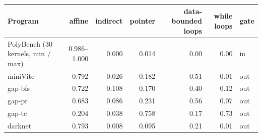 \begin{tabular}{lrrrrrl}
\toprule
Program & affine & indirect & pointer & data-bounded loops & while loops & gate \\
\midrule
PolyBench (30 kernels, min / max) & 0.986--1.000 & 0.000 & 0.014 & 0.00 & 0.00 & in \\
miniVite & 0.792 & 0.026 & 0.182 & 0.51 & 0.01 & out \\
gap-bfs & 0.722 & 0.108 & 0.170 & 0.40 & 0.12 & out \\
gap-pr & 0.683 & 0.086 & 0.231 & 0.56 & 0.07 & out \\
gap-tc & 0.204 & 0.038 & 0.758 & 0.17 & 0.73 & out \\
darknet & 0.793 & 0.008 & 0.095 & 0.21 & 0.01 & out \\
\bottomrule
\end{tabular}
